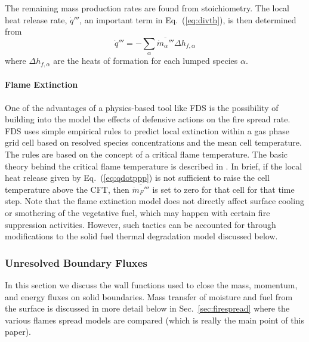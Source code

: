 \documentclass[journal,article,atmosphere,submit,moreauthors,pdftex]{Definitions/mdpi}
\begin{document}
The remaining mass production rates are found from stoichiometry.  The local heat release rate, $\dot{q}'''$, an important term in Eq.~(\ref{eq:divth}), is then determined from
\begin{equation}
\label{eq:qdotppp}
\dot{q}''' = - \sum_\alpha \overline{\dot{m}_\alpha'''} \Delta h_{f,\alpha}
\end{equation}
where $\Delta h_{f,\alpha}$ are the heats of formation for each lumped species $\alpha$.

\paragraph{Flame Extinction} One of the advantages of a physics-based tool like FDS is the possibility of building into the model the effects of defensive actions on the fire spread rate.  FDS uses simple empirical rules to predict local extinction within a gas phase grid cell based on resolved species concentrations and the mean cell temperature. The rules are based on the concept of a critical flame temperature. The basic theory behind the critical flame temperature is described in \cite{SFPE:Beyler}.  In brief, if the local heat release given by Eq.~(\ref{eq:qdotppp}) is not sufficient to raise the cell temperature above the CFT, then $\overline{\dot{m}_{F}'''}$ is set to zero for that cell for that time step.  Note that the flame extinction model does not directly affect surface cooling or smothering of the vegetative fuel, which may happen with certain fire suppression activities.  However, such tactics can be accounted for through modifications to the solid fuel thermal degradation model discussed below.

\subsubsection{Unresolved Boundary Fluxes}

In this section we discuss the wall functions used to close the mass, momentum, and energy fluxes on solid boundaries.  Mass transfer of moisture and fuel from the surface is discussed in more detail below in Sec.~\ref{sec:firespread} where the various flames spread models are compared (which is really the main point of this paper).
\end{document}

